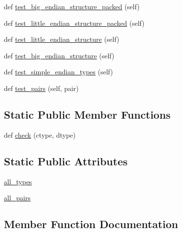 \begin{DoxyCompactItemize}
\item 
def \hyperlink{classnumpy_1_1core_1_1tests_1_1test__dtype_1_1TestFromCTypes_a6068ee3fc2a1a198eca6480e9aeb3629}{test\+\_\+big\+\_\+endian\+\_\+structure\+\_\+packed} (self)
\item 
def \hyperlink{classnumpy_1_1core_1_1tests_1_1test__dtype_1_1TestFromCTypes_a9112c388caf67403b5979124fec315d0}{test\+\_\+little\+\_\+endian\+\_\+structure\+\_\+packed} (self)
\item 
def \hyperlink{classnumpy_1_1core_1_1tests_1_1test__dtype_1_1TestFromCTypes_a7ccbdc714c33bf41f8bd2bca7ba5540d}{test\+\_\+little\+\_\+endian\+\_\+structure} (self)
\item 
def \hyperlink{classnumpy_1_1core_1_1tests_1_1test__dtype_1_1TestFromCTypes_a9dae3c548c9ab0649e08114518abb9f8}{test\+\_\+big\+\_\+endian\+\_\+structure} (self)
\item 
def \hyperlink{classnumpy_1_1core_1_1tests_1_1test__dtype_1_1TestFromCTypes_a100c461e4e770dd5662afa298bb4f9e2}{test\+\_\+simple\+\_\+endian\+\_\+types} (self)
\item 
def \hyperlink{classnumpy_1_1core_1_1tests_1_1test__dtype_1_1TestFromCTypes_ae6a1278b951ed7f41ca7f69c0cbeeb57}{test\+\_\+pairs} (self, pair)
\end{DoxyCompactItemize}
\subsection*{Static Public Member Functions}
\begin{DoxyCompactItemize}
\item 
def \hyperlink{classnumpy_1_1core_1_1tests_1_1test__dtype_1_1TestFromCTypes_ad38437358bd9579945b19d27f00cf1b5}{check} (ctype, dtype)
\end{DoxyCompactItemize}
\subsection*{Static Public Attributes}
\begin{DoxyCompactItemize}
\item 
\hyperlink{classnumpy_1_1core_1_1tests_1_1test__dtype_1_1TestFromCTypes_a97f3ccd608036529bbe12dc9c7391997}{all\+\_\+types}
\item 
\hyperlink{classnumpy_1_1core_1_1tests_1_1test__dtype_1_1TestFromCTypes_a8ddaf01c149b3bdbcaffd27b48eec3ce}{all\+\_\+pairs}
\end{DoxyCompactItemize}


\subsection{Member Function Documentation}
\mbox{\label{classnumpy_1_1core_1_1tests_1_1test__dtype_1_1TestFromCTypes_ad38437358bd9579945b19d27f00cf1b5}} 
